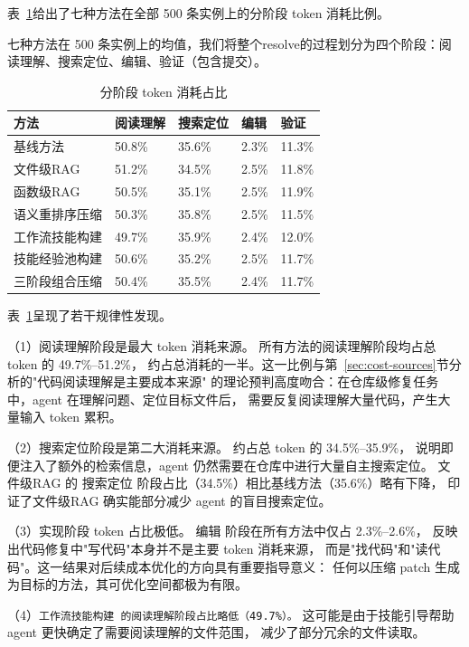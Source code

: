 表~\ref{tab:phase-breakdown}给出了七种方法在全部 500 条实例上的分阶段 token 消耗比例。

\begin{table}[htbp]
  \centering
  \caption{分阶段 token 消耗占比}
  {\footnotesize 七种方法在 500 条实例上的均值，我们将整个resolve的过程划分为四个阶段：阅读理解、搜索定位、编辑、验证（包含提交）。}
  \label{tab:phase-breakdown}
  \begin{tabularx}{\textwidth}{lXXXX}
    \toprule
    方法 & 阅读理解 & 搜索定位 & 编辑 & 验证 \\
    \midrule
    基线方法       & 50.8\% & 35.6\% & 2.3\% & 11.3\% \\
    文件级RAG           & 51.2\% & 34.5\% & 2.5\% & 11.8\% \\
    函数级RAG       & 50.5\% & 35.1\% & 2.5\% & 11.9\% \\
    语义重排序压缩 & 50.3\% & 35.8\% & 2.5\% & 11.5\% \\
    工作流技能构建  & 49.7\% & 35.9\% & 2.4\% & 12.0\% \\
    技能经验池构建   & 50.6\% & 35.2\% & 2.5\% & 11.7\% \\
    三阶段组合压缩   & 50.4\% & 35.5\% & 2.4\% & 11.7\% \\
    \bottomrule
  \end{tabularx}
\end{table}

表~\ref{tab:phase-breakdown}呈现了若干规律性发现。

（1）阅读理解阶段是最大 token 消耗来源。
所有方法的阅读理解阶段均占总 token 的 49.7\%–51.2\%，
约占总消耗的一半。这一比例与第~\ref{sec:cost-sources}节分析的"代码阅读理解是主要成本来源"
的理论预判高度吻合：在仓库级修复任务中，agent 在理解问题、定位目标文件后，
需要反复阅读理解大量代码，产生大量输入 token 累积。

（2）搜索定位阶段是第二大消耗来源。
约占总 token 的 34.5\%–35.9\%，
说明即便注入了额外的检索信息，agent 仍然需要在仓库中进行大量自主搜索定位。
文件级RAG 的 搜索定位 阶段占比（34.5\%）相比基线方法（35.6\%）略有下降，
印证了文件级RAG 确实能部分减少 agent 的盲目搜索定位。

（3）实现阶段 token 占比极低。
编辑 阶段在所有方法中仅占 2.3\%–2.6\%，
反映出代码修复中"写代码"本身并不是主要 token 消耗来源，
而是"找代码"和"读代码"。这一结果对后续成本优化的方向具有重要指导意义：
任何以压缩 patch 生成为目标的方法，其可优化空间都极为有限。

（4）\texttt{工作流技能构建 的阅读理解阶段占比略低（49.7\%）。}
这可能是由于技能引导帮助 agent 更快确定了需要阅读理解的文件范围，
减少了部分冗余的文件读取。


